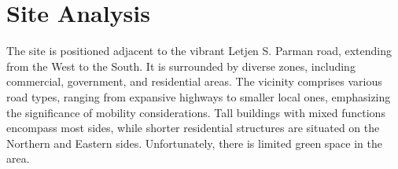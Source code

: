 \section*{
  Site Analysis
 }
\vspace{0pt}
\setlength{\columnsep}{0.25cm}
\begin{multicols}{3}
	
	
	
\end{multicols}
The site is positioned adjacent to the vibrant Letjen S. Parman road, extending from the West to the South. It is surrounded by diverse zones, including commercial, government, and residential areas. The vicinity comprises various road types, ranging from expansive highways to smaller local ones, emphasizing the significance of mobility considerations. Tall buildings with mixed functions encompass most sides, while shorter residential structures are situated on the Northern and Eastern sides. Unfortunately, there is limited green space in the area.
\vfill

\columnbreak%
